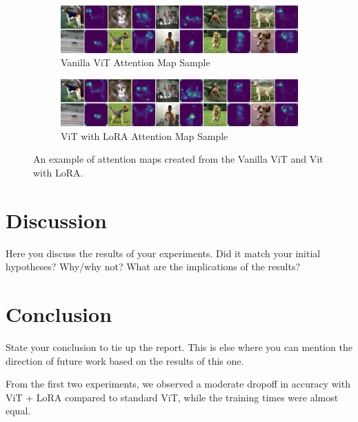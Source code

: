 \documentclass[10pt]{article}
\begin{document}
\begin{figure}[htbp]
    \centering
    \begin{subfigure}[b]{0.9\textwidth}
        \centering
        \includegraphics[width=\textwidth]{images/grid_attention_vit.png} %
        \caption{Vanilla ViT Attention Map Sample}
        \label{fig:vit_attentionmap}
    \end{subfigure}

    \vspace{0.5cm} %

    \begin{subfigure}[b]{0.9\textwidth}
        \centering
        \includegraphics[width=\textwidth]{images/grid_attention_lora.png} %
        \caption{ViT with LoRA Attention Map Sample}
        \label{fig:lora_attentionmap}
    \end{subfigure}

    \caption{An example of attention maps created from the Vanilla ViT and Vit with LoRA.}
    \label{fig:attentionmaps}
\end{figure}

\section{Discussion}
Here you discuss the results of your experiments. Did it match your initial hypotheses? Why/why not? What are the implications of the results?

\section{Conclusion}
State your conclusion to tie up the report. This is else where you can mention the direction of future work based on the results of this one.

From the first two experiments, we observed a moderate dropoff in accuracy with ViT + LoRA compared to standard ViT, while the training times were almost equal.
\end{document}
